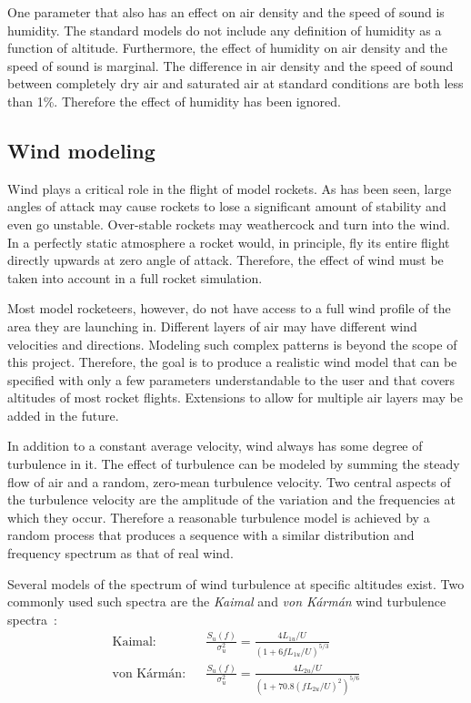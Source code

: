 One parameter that also has an effect on air density and the speed of
sound is humidity.  The standard models do not include any definition
of humidity as a function of altitude.  Furthermore, the effect of
humidity on air density and the speed of sound is marginal.  The
difference in air density and the speed of sound between completely dry
air and saturated air at standard conditions are both less than 1\%.
Therefore the effect of humidity has been ignored.




\subsection{Wind modeling}

Wind plays a critical role in the flight of model rockets.  As has
been seen, large angles of attack may cause rockets to lose a
significant amount of stability and even go unstable.  Over-stable
rockets may weathercock and turn into the wind.  In a perfectly static
atmosphere a rocket would, in principle, fly its entire flight
directly upwards at zero angle of attack.  Therefore, the effect of
wind must be taken into account in a full rocket simulation.

Most model rocketeers, however, do not have access to a full wind
profile of the area they are launching in.  Different layers of air
may have different wind velocities and directions.  Modeling such
complex patterns is beyond the scope of this project. Therefore, the
goal is to produce a realistic wind model that can be specified with
only a few parameters understandable to the user and that covers
altitudes of most rocket flights.  Extensions to allow for multiple
air layers may be added in the future.

In addition to a constant average velocity, wind always has some
degree of turbulence in it.  The effect of turbulence can be modeled
by summing the steady flow of air and a random, zero-mean turbulence
velocity.  Two central aspects of the turbulence velocity are the
amplitude of the variation and the frequencies at which they occur.
Therefore a reasonable turbulence model is achieved by a random
process that produces a sequence with a similar distribution and
frequency spectrum as that of real wind.

Several models of the spectrum of wind turbulence at specific
altitudes exist.  Two commonly used such spectra are the {\it Kaimal}
and {\it von Kármán} wind turbulence
spectra~\cite[p.~23]{wind-energy-handbook}:
%
\begin{eqnarray}
\mbox{Kaimal:} & & \frac{S_u(f)}{\sigma_u^2} =
    \frac{4 L_{1u} / U}{(1 + 6fL_{1u}/U)^{5/3}} \label{eq-kaimal-wind} \\
%
\mbox{von Kármán:} & & \frac{S_u(f)}{\sigma_u^2} =
    \frac{4 L_{2u} / U}{(1 + 70.8(fL_{2u}/U)^2)^{5/6}} \label{eq-karman-wind}
\end{eqnarray}

